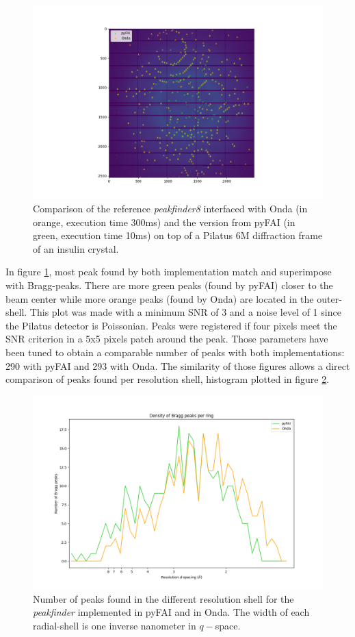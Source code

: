 \documentclass[preprint]{iucr}              %
\begin{document}
\begin{figure}
\label{peakfinder}
\includegraphics[width=12cm]{peakfinder}
\caption{Comparison of the reference \textit{peakfinder8} interfaced with Onda (in orange, execution time 300ms) and the version from pyFAI (in green, execution time 10ms) on top of a Pilatus 6M diffraction frame of an insulin crystal.}
\end{figure}

In figure \ref{peakfinder}, most peak found by both implementation match and superimpose with Bragg-peaks.
There are more green peaks (found by pyFAI) closer to the beam center while more orange peaks (found by Onda) are located in the outer-shell.
This plot was made with a minimum SNR of 3 and a noise level of 1 since the Pilatus detector is Poissonian.
Peaks were registered if four pixels meet the SNR criterion in a 5x5 pixels patch around the peak.
Those parameters have been tuned to obtain a comparable number of peaks with both implementations: 290 with pyFAI and 293 with Onda.
The similarity of those figures allows a direct comparison of peaks found per resolution shell, histogram plotted in figure \ref{peak_per_ring}.

\begin{figure}
\label{peak_per_ring}
\includegraphics[width=12cm]{peak_per_ring}
\caption{Number of peaks found in the different resolution shell for the \textit{peakfinder} implemented in pyFAI and in Onda. The width of each radial-shell is one inverse nanometer in $q-$space.}
\end{figure}
\end{document}
